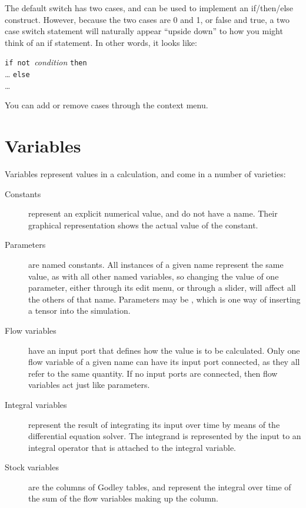 The default switch has two cases, and can be used to implement an
if/then/else construct. However, because the two cases are 0 and 1, or
false and true, a two case switch statement will naturally appear
``upside down'' to how you might think of an if statement. In other
words, it looks like:

\parbox{\textwidth}{
  {\tt if not }{\em condition} {\tt then}\\
  \ldots
  {\tt else}\\
  \ldots }

You can add or remove cases through the context menu.

\section{Variables}\label{Variables}\label{Variable:constant}\label{VarConstant}\label{Variable:parameter}
\label{Variable:flow}\label{Variable:integral}\label{Variable:stock}

Variables represent values in a calculation, and come in a number of
varieties:
\begin{description}
\item[Constants] represent an explicit numerical value, and do not
  have a name. Their graphical representation shows the actual value
  of the constant.
\item[Parameters] are named constants. All instances of a given name
  represent the same value, as with all other named variables, so
  changing the value of one parameter, either through its edit menu,
  or through a slider, will affect all the others of that
  name. Parameters may be , which is one way of inserting a tensor into the
  simulation.
\item[Flow variables] have an input port that defines how the value is
  to be calculated. Only one flow variable of a given name can have
  its input port connected, as they all refer to the same quantity. If
  no input ports are connected, then flow variables act just like
  parameters.
\item[Integral variables] represent the result of integrating its
  input over time by means of the differential equation solver. The
  integrand is represented by the input to an integral operator that
  is attached to the integral variable.
\item[Stock variables] are the columns of Godley tables, and represent
  the integral over time of the sum of the flow variables making up
  the column.
\end{description}

